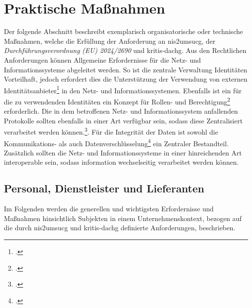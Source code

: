 \documentclass[11pt,a4paper,hidelinks]{article}   %
\begin{document}
    \newpage
    \section{Praktische Maßnahmen}\label{sec:ParktischeMaßnahmen}
    Der folgende Abschnitt beschreibt exemplarisch organisatorische oder technische Maßnahmen, welche die Erfüllung der Anforderung an \gls{nis2umsucg}, der \emph{Durchführungsverordnung (EU) 2024/2690} und \gls{kritis-dachg}. Aus den Rechtlichen Anforderungen können Allgemeine Erfordernisse für die Netz- und Informationssysteme abgeleitet werden. So ist die zentrale Verwaltung Identitäten Vorteilhaft, jedoch erfordert dies die Unterstützung der Verwendung von externen Identitätsanbieter\footcite[Vgl.][, Nummer 3.2.3., 11.2.2.]{EU2024-2690} in den Netz- und Informationssystemen. Ebenfalls ist ein für die zu verwendenden Identitäten ein Konzept für Rollen- und Berechtigung\footcite[Vgl.][, Nummer 11.2.2.]{EU2024-2690} erforderlich. Die in dem betroffenen Netz- und Informationssystem anfallenden Protokolle sollten ebenfalls in einer Art verfügbar sein, sodass diese Zentralisiert verarbeitet werden können.\footcite[Vgl.][, Nummer 3.2.2., 3.2.3.]{EU2024-2690}. Für die Integrität der Daten ist sowohl die Kommunikations- als auch Datenverschlüsselung\footcite[Vgl.][, Nummer 9.2]{EU2024-2690} ein Zentraler Bestandteil. Zusätzlich sollten die Netz- und Informationssysteme in einer hinreichenden Art interoperable sein, sodass information wechselseitig verarbeitet werden können. 
        \subsection{Personal, Dienstleister und Lieferanten}
        Im Folgenden werden die generellen und wichtigsten Erfordernisse und Maßnahmen hinsichtlich Subjekten in einem Unternehmenskontext, bezogen auf die durch \gls{nis2umsucg} und \gls{kritis-dachg} definierte Anforderungen, beschrieben.
\end{document}
